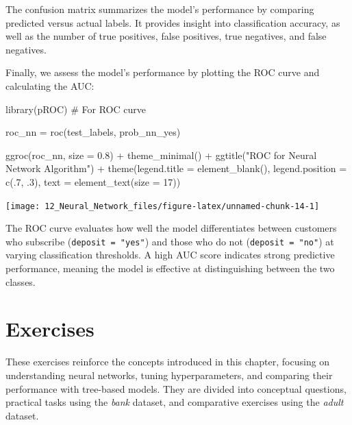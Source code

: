 \documentclass[
  11pt,
]{book}
\makeatletter
\newenvironment{Shaded}{}{}
\newcommand{\AttributeTok}[1]{#1}
\newcommand{\CommentTok}[1]{\textcolor[rgb]{0.36,0.36,0.36}{#1}}
\newcommand{\DecValTok}[1]{#1}
\newcommand{\FloatTok}[1]{#1}
\newcommand{\FunctionTok}[1]{#1}
\newcommand{\NormalTok}[1]{#1}
\newcommand{\OtherTok}[1]{\textcolor[rgb]{0.39,0.39,0.39}{#1}}
\newcommand{\SpecialCharTok}[1]{\textcolor[rgb]{0.39,0.39,0.39}{#1}}
\newcommand{\StringTok}[1]{\textcolor[rgb]{0.39,0.39,0.39}{#1}}
\newenvironment{kframe}{%
\medskip{}
\setlength{\fboxsep}{.8em}
 \def\at@end@of@kframe{}%
 \ifinner\ifhmode%
  \def\at@end@of@kframe{\end{minipage}}%
  \begin{minipage}{\columnwidth}%
 \fi\fi%
 \def\FrameCommand##1{\hskip\@totalleftmargin \hskip-\fboxsep
 \colorbox{shadecolor}{##1}\hskip-\fboxsep
     \hskip-\linewidth \hskip-\@totalleftmargin \hskip\columnwidth}%
 \MakeFramed {\advance\hsize-\width
   \@totalleftmargin\z@ \linewidth\hsize
   \@setminipage}}%
 {\par\unskip\endMakeFramed%
 \at@end@of@kframe}
\renewenvironment{Shaded}{\begin{kframe}}{\end{kframe}}
\theoremstyle{definition}
\theoremstyle{definition}
\theoremstyle{definition}
\theoremstyle{definition}
\theoremstyle{remark}
\makeatother
\begin{document}
The confusion matrix summarizes the model's performance by comparing predicted versus actual labels. It provides insight into classification accuracy, as well as the number of true positives, false positives, true negatives, and false negatives.

Finally, we assess the model's performance by plotting the ROC curve and calculating the AUC:

\begin{Shaded}
\begin{Highlighting}[]
\FunctionTok{library}\NormalTok{(pROC)   }\CommentTok{\# For ROC curve}

\NormalTok{roc\_nn }\OtherTok{=} \FunctionTok{roc}\NormalTok{(test\_labels, prob\_nn\_yes)}

\FunctionTok{ggroc}\NormalTok{(roc\_nn, }\AttributeTok{size =} \FloatTok{0.8}\NormalTok{) }\SpecialCharTok{+} 
  \FunctionTok{theme\_minimal}\NormalTok{() }\SpecialCharTok{+} 
  \FunctionTok{ggtitle}\NormalTok{(}\StringTok{"ROC for Neural Network Algorithm"}\NormalTok{) }\SpecialCharTok{+}
  \FunctionTok{theme}\NormalTok{(}\AttributeTok{legend.title =} \FunctionTok{element\_blank}\NormalTok{(), }\AttributeTok{legend.position =} \FunctionTok{c}\NormalTok{(.}\DecValTok{7}\NormalTok{, .}\DecValTok{3}\NormalTok{), }\AttributeTok{text =} \FunctionTok{element\_text}\NormalTok{(}\AttributeTok{size =} \DecValTok{17}\NormalTok{))}
\end{Highlighting}
\end{Shaded}

\begin{center}\texttt{[image: 12\_Neural\_Network\_files/figure-latex/unnamed-chunk-14-1]} \end{center}

The ROC curve evaluates how well the model differentiates between customers who subscribe (\texttt{deposit\ =\ "yes"}) and those who do not (\texttt{deposit\ =\ "no"}) at varying classification thresholds. A high AUC score indicates strong predictive performance, meaning the model is effective at distinguishing between the two classes.

\section*{Exercises}\label{exercises-8}


These exercises reinforce the concepts introduced in this chapter, focusing on understanding neural networks, tuning hyperparameters, and comparing their performance with tree-based models. They are divided into conceptual questions, practical tasks using the \emph{bank} dataset, and comparative exercises using the \emph{adult} dataset.
\end{document}
